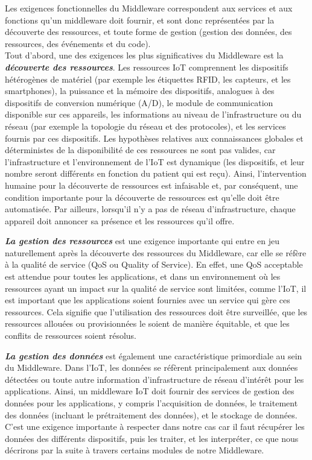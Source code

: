 Les exigences fonctionnelles du Middleware correspondent aux services et aux fonctions qu’un middleware doit fournir, et sont donc représentées par la découverte des ressources, et toute forme de gestion (gestion des données, des ressources, des événements et du code).
\\

Tout d'abord, une des exigences les plus significatives du Middleware est la \textbf{\textit{découverte des ressources}}. Les ressources IoT comprennent les dispositifs hétérogènes de matériel (par exemple les étiquettes RFID, les capteurs, et les smartphones), la puissance et la mémoire des dispositifs, analogues à des dispositifs de conversion numérique (A/D), le module de communication disponible sur ces appareils, les informations au niveau de l'infrastructure ou du réseau (par exemple la topologie du réseau et des protocoles), et les services fournis par ces dispositifs. Les hypothèses relatives aux connaissances globales et déterministes de la disponibilité de ces ressources ne sont pas valides, car l'infrastructure et l'environnement de l'IoT est dynamique (les dispositifs, et leur nombre seront différents en fonction du patient qui est reçu). Ainsi, l'intervention humaine pour la découverte de ressources est infaisable et, par conséquent, une condition importante pour la découverte de ressources est qu'elle doit être automatisée. Par ailleurs, lorsqu'il n'y a pas de réseau d'infrastructure, chaque appareil doit annoncer sa présence et les ressources qu'il offre.

\textbf{\textit{La gestion des ressources}} est une exigence importante qui entre en jeu naturellement après la découverte des ressources du Middleware, car elle se réfère à la qualité de service (QoS ou Quality of Service). En effet, une QoS acceptable est attendue pour toutes les applications, et dans un environnement où les ressources ayant un impact sur la qualité de service sont limitées, comme l'IoT, il est important que les applications soient fournies avec un service qui gère ces ressources. Cela signifie que l'utilisation des ressources doit être surveillée, que les ressources allouées ou provisionnées le soient de manière équitable, et que les conflits de ressources soient résolus.

\textbf{\textit{La gestion des données}} est également une caractéristique primordiale au sein du Middleware. Dans l'IoT, les données se réfèrent principalement aux données détectées ou toute autre information d'infrastructure de réseau d'intérêt pour les applications. Ainsi, un middleware IoT doit fournir des services de gestion des données pour les applications, y compris l'acquisition de données, le traitement des données (incluant le prétraitement des données), et le stockage de données. C'est une exigence importante à respecter dans notre cas car il faut récupérer les données des différents dispositifs, puis les traiter, et les interpréter, ce que nous décrirons par la suite à travers certains modules de notre Middleware.


